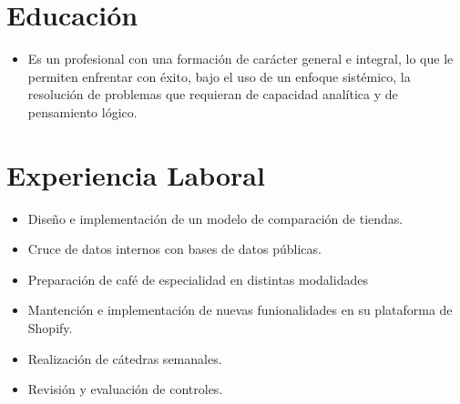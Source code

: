 \documentclass{my_cv}
\begin{document}
\makecvtitle
\vspace*{-1cm}

\section{Educaci\'on \faBook} 
\begin{itemize}
\item Es un profesional con una formación de carácter general e integral, lo que le permiten enfrentar con éxito, bajo el uso de un enfoque sist\'emico, la resolución de problemas que requieran de capacidad analítica y de pensamiento l\'ogico.
\end{itemize}

\section{Experiencia Laboral \faSuitcase}
\begin{itemize}
\item Dise\~no e implementaci\'on de un modelo de comparaci\'on de tiendas.
\item Cruce de datos internos con bases de datos p\'ublicas.
\end{itemize}
\begin{itemize}
\item Preparaci\'on de caf\'e de especialidad en distintas modalidades
\item Mantenci\'on e implementaci\'on de nuevas funionalidades en su plataforma de Shopify.
\end{itemize}
\begin{itemize}
\item Realizaci\'on de c\'atedras semanales.
\item Revisión y evaluaci\'on de controles.
\end{itemize}
\end{document}
